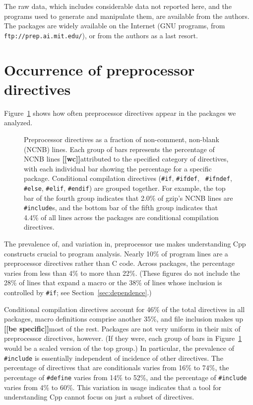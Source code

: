 \documentclass[10pt]{article}
\newcommand{\comment}[1]{\textbf{[[#1]]}}
\newcommand{\captionsmall}[1]{\caption[]{\small #1}}
\begin{document}
The raw data, which includes considerable data not reported here, and the
programs used to generate and manipulate them, are available from the
authors.  The packages are widely available on the Internet (GNU programs,
from {\tt ftp://prep.ai.mit.edu/}), or from the authors as a last resort.


\section{Occurrence of preprocessor directives}
\label{sec:directives}
\label{sec:first-content-section}

Figure~\ref{fig:directives-breakdown} shows how often preprocessor
directives appear in the packages we analyzed.

\begin{figure}
\centerline{}
\captionsmall{Preprocessor directives as a fraction of non-comment,
  non-blank (NCNB) lines.  Each group of bars represents the percentage of
  NCNB lines \comment{wc}attributed to the specified category of directives, with each
  individual bar showing the percentage for a specific package.
  Conditional compilation directives ({\tt \#if}, {\tt \#ifdef}, {\tt
  \#ifndef}, {\tt \#else}, {\tt \#elif}, {\tt \#endif}) are grouped
  together.  For example, the top bar of the fourth group indicates that
  2.0\% of gzip's NCNB lines are {\tt \#include}s, and the bottom bar of the
  fifth group indicates that 4.4\% of all lines across the packages are
  conditional compilation directives.}
\label{fig:directives-breakdown}
\end{figure}

The prevalence of, and variation in, preprocessor use makes understanding
Cpp constructs crucial to program analysis.  Nearly 10\% of program
lines are a preprocessor directives rather than C code.  Across packages, the
percentage varies from less than 4\% to more than 22\%.  (These figures do
not include the 28\% of lines that expand a macro or the 38\% of lines
whose inclusion is controlled by {\tt \#if}; see
Section~\ref{sec:dependence}.)


Conditional compilation directives account for 46\% of
the total directives in all packages, macro definitions comprise another
35\%, and file inclusion makes up \comment{be specific}most of the rest.  Packages are not very
uniform in their mix of preprocessor directives, however.  (If they were,
each group of bars in Figure~\ref{fig:directives-breakdown} would be
a scaled version of the top group.)  In particular, the prevalence of {\tt
\#include} is essentially independent of incidence of other directives.
The percentage of directives that are conditionals varies from 16\% to
74\%, the percentage of {\tt \#define} varies from 14\% to 52\%, and the
percentage of {\tt \#include} varies from 4\% to 60\%.  This variation in
usage indicates that a tool for understanding Cpp cannot focus on just a
subset of directives.
\end{document}
